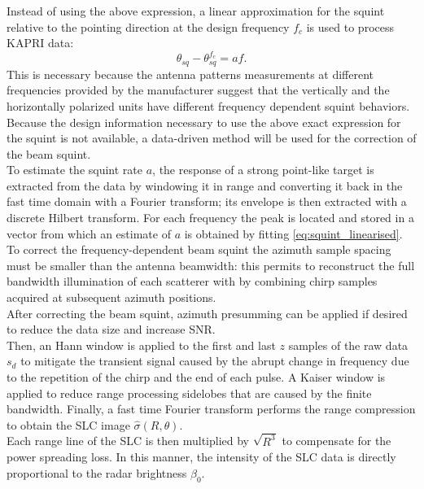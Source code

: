 Instead of using the above expression, a linear approximation for the squint relative to the pointing direction at the design frequency $f_c$ is used to process KAPRI data:
\begin{equation}\label{eq:squint_linearised}
	\theta_{sq} - \theta_{sq}^{f_{c}}  =  a f.
\end{equation}
This is necessary because the antenna patterns measurements at different frequencies provided by the manufacturer suggest that the vertically and the horizontally polarized units have different frequency dependent squint behaviors. Because the design information necessary to use the above exact expression for the squint is not available, a data-driven method will be used for the correction of the beam squint.\\ To estimate the squint rate $a$, the response of a strong point-like target is extracted from the data by windowing it in range and converting it back in the fast time domain with a Fourier transform; its envelope is then extracted with a discrete Hilbert transform. For each frequency the peak is located and stored in a vector from which an estimate of $a$ is obtained by fitting \eqref{eq:squint_linearised}.\\
To correct the frequency-dependent beam squint the azimuth sample spacing must be smaller than the antenna beamwidth: this permits to reconstruct the full bandwidth illumination of each scatterer with by combining chirp samples acquired at subsequent azimuth positions.\\
After correcting the beam squint, azimuth presumming can be applied if desired to reduce the data size and increase SNR.\\ Then, an Hann window is applied to the first and last $z$ samples of the raw data $s_{d}$ to mitigate the transient signal caused by the abrupt change in frequency due to the repetition of the chirp and the end of each pulse. A Kaiser window is applied to reduce range processing sidelobes that are caused by the finite bandwidth. Finally, a fast time Fourier transform performs the range compression to obtain the SLC image $\hat{\sigma}\left(R, \theta\right)$.\\ Each range line of the SLC  is then multiplied by $\sqrt{R^3}$ to compensate for the power spreading loss. In this manner, the intensity of the SLC data is directly proportional to the radar brightness $\beta_{0}$\cite{Raney1994}. 
